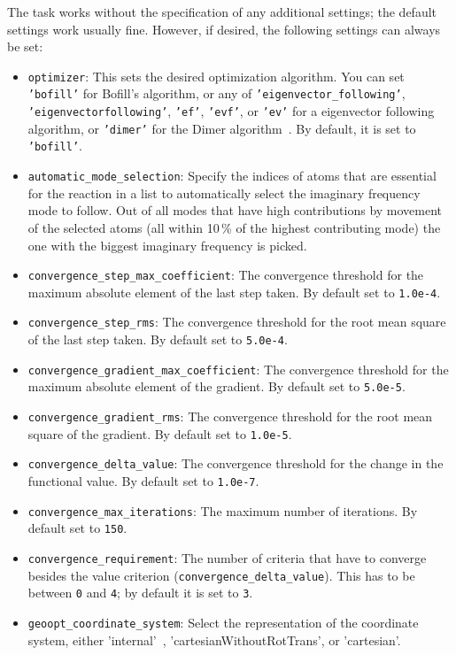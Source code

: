 \documentclass[]{tufte-book}
\begin{document}
The task works without the specification of any additional settings; the default settings work usually fine. However,
if desired, the following settings can always be set:
\begin{itemize}
\item \texttt{optimizer}: This sets the desired optimization algorithm. You can set \texttt{'bofill'} for Bofill's algorithm\cite{bofill1, bofill2},
or any of \texttt{'eigenvector\_following'}, \texttt{'eigenvectorfollowing'}, \texttt{'ef'}, \texttt{'evf'}, or \texttt{'ev'} for a
eigenvector following algorithm, or \texttt{'dimer'} for the Dimer algorithm~\cite{dimer1,dimer2,dimer3}. By default, it is set to \texttt{'bofill'}.
\item \texttt{automatic\_mode\_selection}: Specify the indices of atoms that are essential for the reaction in a list to automatically
 select the imaginary frequency mode to follow. Out of all modes that have high contributions by movement of the selected atoms
 (all within 10\,\% of the highest contributing mode) the one with the biggest imaginary frequency is picked.
\item \texttt{convergence\_step\_max\_coefficient}: The convergence threshold for the maximum absolute element of the last step taken.
By default set to \texttt{1.0e-4}.
\item \texttt{convergence\_step\_rms}: The convergence threshold for the root mean square of the last step taken. By default set to
\texttt{5.0e-4}.
\item \texttt{convergence\_gradient\_max\_coefficient}: The convergence threshold for the maximum absolute element of the gradient.
By default set to \texttt{5.0e-5}.
\item \texttt{convergence\_gradient\_rms}: The convergence threshold for the root mean square of the gradient. By default set to
\texttt{1.0e-5}.
\item \texttt{convergence\_delta\_value}: The convergence threshold for the change in the functional value. By default set to
\texttt{1.0e-7}.
\item \texttt{convergence\_max\_iterations}: The maximum number of iterations. By default set to \texttt{150}.
\item \texttt{convergence\_requirement}: The number of criteria that have to converge besides the value criterion
(\texttt{convergence\_delta\_value}). This has to be between \texttt{0} and \texttt{4}; by default it is set to \texttt{3}.
\item \texttt{geoopt\_coordinate\_system}: Select the representation of the coordinate system, either 'internal'~\cite{libirc}, 'cartesianWithoutRotTrans', or 'cartesian'.

\end{itemize}
\end{document}
